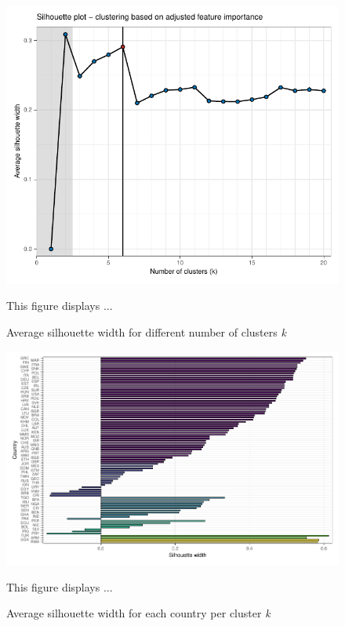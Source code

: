 \documentclass[12pt, a4paper]{article}
\newenvironment{subcaption}
{\strut
\vspace{-5pt}
\begin{minipage}[b]{0.9\textwidth}
  \hspace*{-\parindent}
  \footnotesize}
 {\end{minipage}}
\begin{document}
 \clearpage

 \begin{figure}[ht!]
   \centering
   \caption{Average silhouette width for different number of clusters \textit{k}} \label{fig:G3_silhouette_2}
   \includegraphics{Figures_Appendix/Figure_Silhouette_2}
   \begin{subcaption}
     This figure displays ...
   \end{subcaption}
 \end{figure}

 \clearpage

 \begin{figure}[ht!]
   \centering
   \caption{Average silhouette width for each country per cluster \textit{k}} \label{fig:G4_silhouette_2}
   \includegraphics{Figures_Appendix/Figure_Silhouette_Clusters_2}
   \begin{subcaption}
     This figure displays ...
   \end{subcaption}
 \end{figure}
\end{document}
